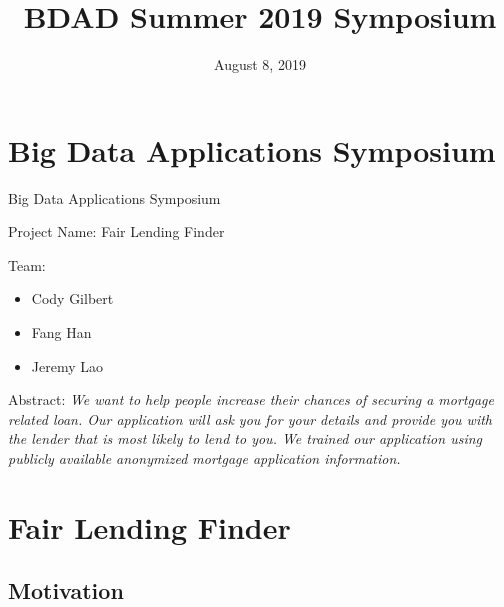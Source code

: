 \documentclass{beamer}
\title[BDAD Summer 2019 Symposium]{BDAD Summer 2019 Symposium}
\institute{NYU Courant, Computer Science}
\date{August 8, 2019}
\begin{document}
\begin{frame}
  \titlepage
\end{frame}


\section{Big Data Applications Symposium}

\begin{frame}{Big Data Applications Symposium}

Project Name: Fair Lending Finder \vspace{3mm}

Team: 

\begin{itemize}
  \item Cody Gilbert
  \item Fang Han
  \item Jeremy Lao
\end{itemize}

Abstract:  \textit{We want to help people increase their chances of securing a mortgage related loan.  Our application will ask you for your details and provide you with the lender that is most likely to lend to you.  We trained our application using publicly available anonymized mortgage application information.}

\vskip 0.5cm

\end{frame}

\section{Fair Lending Finder}

\subsection{Motivation}
\end{document}
